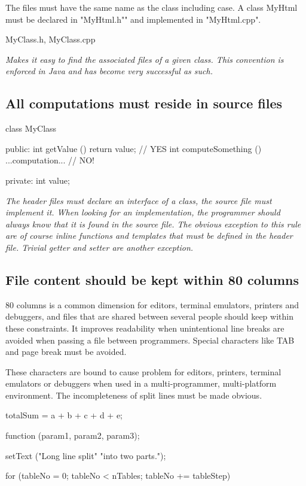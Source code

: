 \documentclass[a4paper,11pt,oneside]{scrbook}
\newcommand{\guideline}[1]{{\subsection{#1}}}
\newcommand{\motivation}[1]{{\normalfont \itshape #1}}
\newcommand{\trfile}[1]{"#1"}
\newcommand{\trcode}[1]{{\normalfont \ttfamily #1}}
\begin{document}
The files must have the same name as the class including case. A class
\trcode{MyHtml} must be declared in \trfile{MyHtml.h"} and implemented in
\trfile{MyHtml.cpp}.

\begin{code}
  MyClass.h, MyClass.cpp 
\end{code}

\motivation{ 
  Makes it easy to find the associated files of a given class. This convention
  is enforced in Java and has become very successful as such.
}

\guideline{All computations must reside in source files}

\begin{code}
  class MyClass { 
    public: 
      int getValue () {return value;} // YES
      int computeSomething () {...computation...} // NO! 

    private: 
      int value; 
  } 
\end{code}

\motivation{ 
  The header files must declare an interface of a class, the source file must
  implement it. When looking for an implementation, the programmer should always
  know that it is found in the source file. The obvious exception to this rule
  are of course inline functions and templates that must be defined in the
  header file. Trivial getter and setter are another exception.
}

\guideline{File content should be kept within 80 columns}

80 columns is a common dimension for editors, terminal emulators, printers and
debuggers, and files that are shared between several people should keep within
these constraints. It improves readability when unintentional line breaks are
avoided when passing a file between programmers.  Special characters like TAB
and page break must be avoided.

These characters are bound to cause problem for editors, printers, terminal
emulators or debuggers when used in a multi-programmer, multi-platform
environment.  The incompleteness of split lines must be made obvious.

\begin{code}
  totalSum = a + b + c
           + d + e;

  function (param1, param2,
           param3);

  setText ("Long line split"
           "into two parts.");

  for (tableNo = 0; tableNo < nTables;
       tableNo += tableStep) 
\end{code}
\end{document}
